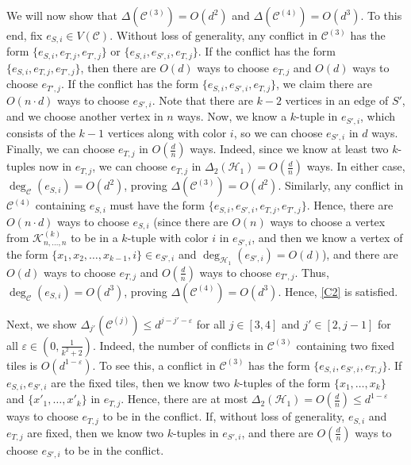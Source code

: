 \documentclass{article}
\theoremstyle{definition}
\newcommand\cH{{\mathcal H}}
\newcommand\cC{{\mathcal C}}
\newcommand\cK{{\mathcal K}}
\begin{document}
    We will now show that $\Delta(\cC^{(3)}) = O(d^2)$ and $\Delta(\cC^{(4)}) = O(d^3)$.  To this end, fix $e_{S,i} \in V(\cC)$.  Without loss of generality, any conflict in $\cC^{(3)}$ has the form $\{e_{S,i}, e_{T,j}, e_{T',j}\}$ or $\{e_{S,i}, e_{S',i}, e_{T,j}\}$.  If the conflict has the form $\{e_{S,i}, e_{T,j}, e_{T',j}\}$, then there are $O( d)$ ways to choose $e_{T,j}$ and $O(d)$ ways to choose $e_{T',j}$.  If the conflict has the form $\{e_{S,i}, e_{S',i}, e_{T,j}\}$, we claim there are $O(n \cdot d)$ ways to choose $e_{S',i}$. Note that there are $k-2$ vertices in an edge of $S'$, and we choose another vertex in $n$ ways. Now, we know a $k$-tuple in $e_{S',i}$, which consists of the $k-1$ vertices along with color $i$, so we can choose $e_{S',i}$ in $d$ ways. Finally, we can choose $e_{T,j}$ in $O(\frac{d}{n})$ ways. Indeed, since we know at least two $k$-tuples now in $e_{T,j}$, we can choose $e_{T,j}$ in $\Delta_2 (\cH_1) = O(\frac{d}{n})$ ways.  In either case, $\deg_\cC(e_{S,i}) = O(d^2)$, proving $\Delta(\cC^{(3)}) = O(d^2)$.  Similarly, any conflict in $\cC^{(4)}$ containing $e_{S,i}$ must have the form $\{e_{S,i}, e_{S',i}, e_{T,j}, e_{T',j}\}$.  Hence, there are $O(n \cdot d)$ ways to choose $e_{S,i}$ (since there are $O(n)$ ways to choose a vertex from $\cK_{n,\dots,n}^{(k)}$ to be in a $k$-tuple with color $i$ in $e_{S',i}$, and then we know a vertex of the form $\{x_1, x_2, \dots, x_{k-1},i\}\in e_{S',i}$ and $\deg_{\cH_1}(e_{S',i}) = O(d)$), and there are $O(d)$ ways to choose $e_{T,j}$ and $O \left(\frac{d}{n} \right)$ ways to choose $e_{T',j}$.  Thus, $\deg_\cC(e_{S,i}) = O(d^3)$, proving $\Delta(\cC^{(4)}) = O(d^3)$.  Hence, \ref{C2} is satisfied.

    Next, we show $\Delta_{j'}(\cC^{(j)}) \leq d^{j-j'-\varepsilon}$ for all $j \in [3,4]$ and $j' \in [2,j-1]$ for all $\varepsilon \in \left( 0,\frac{1}{k^2+2} \right)$. Indeed, the number of conflicts in $\cC^{(3)}$ containing two fixed tiles is $O(d^{1-\varepsilon})$.  To see this, a conflict in $\cC^{(3)}$ has the form $\{e_{S,i}, e_{S',i}, e_{T,j}\}$.  If $e_{S,i}, e_{S',i}$ are the fixed tiles, then we know two $k$-tuples of the form $\{x_1,\dots,x_k\}$ and $\{x'_1,\dots,x'_k\}$ in $e_{T,j}$.  Hence, there are at most $\Delta_2(\cH_1) = O \left( \frac{d}{n} \right) \leq d^{1-\varepsilon}$ ways to choose $e_{T,j}$ to be in the conflict.  If, without loss of generality, $e_{S,i}$ and $e_{T,j}$ are fixed, then we know two $k$-tuples in $e_{S',i}$, and there are $O\left(\frac{d}{n} \right)$ ways to choose $e_{S',i}$ to be in the conflict.  
\end{document}
